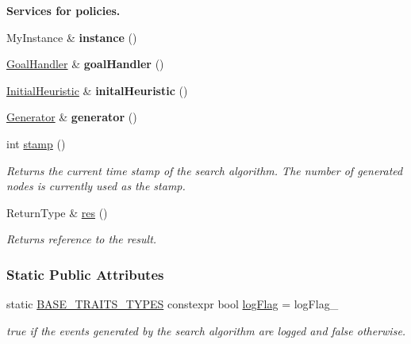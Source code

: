 \begin{Indent}{\bf Services for policies.}\par
\begin{DoxyCompactItemize}
\item 
My\+Instance \& {\bfseries instance} ()\hypertarget{structAlgorithm_a889c17a300661fd1ffdd86ce13fc74f1}{}\label{structAlgorithm_a889c17a300661fd1ffdd86ce13fc74f1}

\item 
\hyperlink{structAlgorithm_a915f86cad5585ba0adb63d017c7afdb2}{Goal\+Handler} \& {\bfseries goal\+Handler} ()\hypertarget{structAlgorithm_a37d97de6a1534e757e2787e725d7fa96}{}\label{structAlgorithm_a37d97de6a1534e757e2787e725d7fa96}

\item 
\hyperlink{structAlgorithm_a01a7b5d204e82e4aed951680a38013a5}{Initial\+Heuristic} \& {\bfseries inital\+Heuristic} ()\hypertarget{structAlgorithm_a4b6f6208369ec029734a7d96f3c987ef}{}\label{structAlgorithm_a4b6f6208369ec029734a7d96f3c987ef}

\item 
\hyperlink{structAlgorithm_ae48d359026f66d7f6c0d15d964a0e8bd}{Generator} \& {\bfseries generator} ()\hypertarget{structAlgorithm_a2bfc60e168c4729c2c2645ae4f2f67b3}{}\label{structAlgorithm_a2bfc60e168c4729c2c2645ae4f2f67b3}

\item 
int \hyperlink{structAlgorithm_a3c42ea606d7beb60ce4aa8e6f45cd446}{stamp} ()
\begin{DoxyCompactList}\small\item\em Returns the current time stamp of the search algorithm. The number of generated nodes is currently used as the stamp. \end{DoxyCompactList}\item 
Return\+Type \& \hyperlink{structAlgorithm_a46fbf6436948ae34d432d55ec76ad377}{res} ()
\begin{DoxyCompactList}\small\item\em Returns reference to the result. \end{DoxyCompactList}\end{DoxyCompactItemize}
\end{Indent}
\subsubsection*{Static Public Attributes}
\begin{DoxyCompactItemize}
\item 
static \hyperlink{algorithm_8h_af9ce42dc0033d5c93cea8af7002ab583}{B\+A\+S\+E\+\_\+\+T\+R\+A\+I\+T\+S\+\_\+\+T\+Y\+P\+ES} constexpr bool \hyperlink{structAlgorithm_a7db9728b4e79c42c5ee64f81f7d0eede}{log\+Flag} = log\+Flag\+\_\+\hypertarget{structAlgorithm_a7db9728b4e79c42c5ee64f81f7d0eede}{}\label{structAlgorithm_a7db9728b4e79c42c5ee64f81f7d0eede}

\begin{DoxyCompactList}\small\item\em {\ttfamily true} if the events generated by the search algorithm are logged and {\ttfamily false} otherwise. \end{DoxyCompactList}\end{DoxyCompactItemize}
